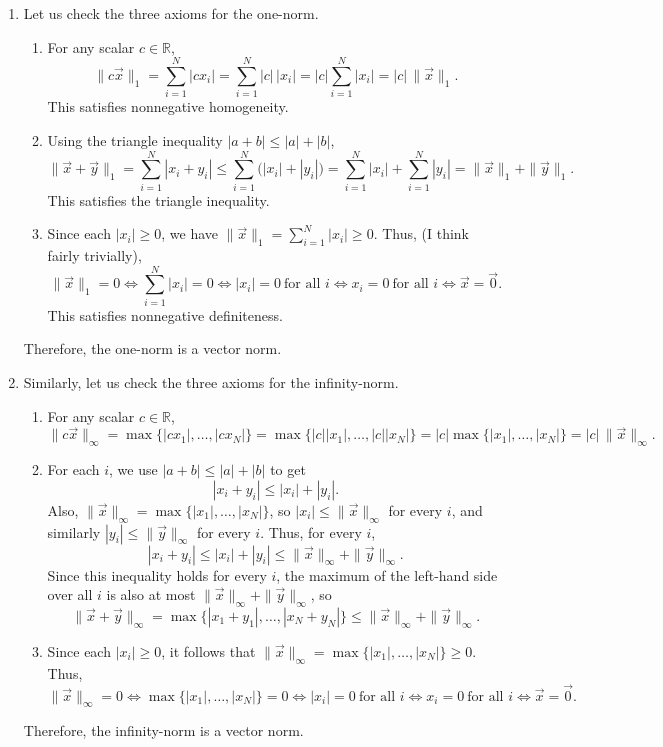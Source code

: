 \documentclass[10pt]{extarticle}
\begin{document}
\begin{enumerate}[label=(\alph*)]
\item Let us check the three axioms for the one-norm.
\begin{enumerate}[label=(\roman*)]
\item For any scalar $c\in\mathbb{R}$,
\[
\|c\vec{x}\|_1=\sum_{i=1}^{N}|cx_i|=\sum_{i=1}^{N}|c|\,|x_i|=|c|\sum_{i=1}^{N}|x_i|=|c|\,\|\vec{x}\|_1.
\]
This satisfies nonnegative homogeneity.
\item Using the triangle inequality $|a+b|\le |a|+|b|$,
\[
\|\vec{x}+\vec{y}\|_1=\sum_{i=1}^{N}|x_i+y_i|\le \sum_{i=1}^{N}\big(|x_i|+|y_i|\big)=\sum_{i=1}^{N}|x_i|+\sum_{i=1}^{N}|y_i|=\|\vec{x}\|_1+\|\vec{y}\|_1.
\]
This satisfies the triangle inequality.
\item Since each $|x_i|\ge 0$, we have $\|\vec{x}\|_1=\sum_{i=1}^{N}|x_i|\ge 0$. Thus, (I think fairly trivially),
\[
\|\vec{x}\|_1=0
\iff
\sum_{i=1}^{N}|x_i|=0
\iff
|x_i|=0\ \text{for all }i
\iff
x_i=0\ \text{for all }i
\iff
\vec{x}=\vec{0}.
\]
This satisfies nonnegative definiteness.
\end{enumerate}
Therefore, the one-norm is a vector norm.
\item Similarly, let us check the three axioms for the infinity-norm.
\begin{enumerate}[label=(\roman*)]
\item For any scalar $c\in\mathbb{R}$,
\[
\|c\vec{x}\|_\infty=\max\{|cx_1|,\dots,|cx_N|\}
=\max\{|c||x_1|,\dots,|c||x_N|\}
=|c|\max\{|x_1|,\dots,|x_N|\}
=|c|\,\|\vec{x}\|_\infty.
\]
\item For each $i$, we use $|a+b|\le |a|+|b|$ to get
\[
|x_i+y_i|\le |x_i|+|y_i|.
\]
Also, $\|\vec{x}\|_\infty=\max\{|x_1|,\dots,|x_N|\}$, so $|x_i|\le \|\vec{x}\|_\infty$ for every $i$, and similarly $|y_i|\le \|\vec{y}\|_\infty$ for every $i$. Thus, for every $i$,
\[
|x_i+y_i|\le |x_i|+|y_i|\le \|\vec{x}\|_\infty+\|\vec{y}\|_\infty.
\]
Since this inequality holds for every $i$, the maximum of the left-hand side over all $i$ is also at most $\|\vec{x}\|_\infty+\|\vec{y}\|_\infty$, so
\[
\|\vec{x}+\vec{y}\|_\infty=\max\{|x_1+y_1|,\dots,|x_N+y_N|\}\le \|\vec{x}\|_\infty+\|\vec{y}\|_\infty.
\]
\item Since each $|x_i|\ge 0$, it follows that $\|\vec{x}\|_\infty=\max\{|x_1|,\dots,|x_N|\}\ge 0$. Thus,
\[
\|\vec{x}\|_\infty=0
\iff
\max\{|x_1|,\dots,|x_N|\}=0
\iff
|x_i|=0\ \text{for all }i
\iff
x_i=0\ \text{for all }i
\iff
\vec{x}=\vec{0}.
\]
\end{enumerate}
Therefore, the infinity-norm is a vector norm.\end{enumerate}
\end{document}
